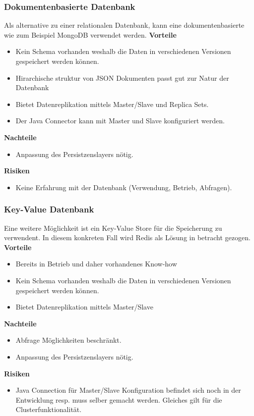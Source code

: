\subsubsection{Dokumentenbasierte Datenbank}

Als alternative zu einer relationalen Datenbank, kann eine dokumentenbasierte wie zum Beispiel MongoDB verwendet werden. 
\newline
\textbf{Vorteile}
\begin{itemize}
	\item Kein Schema vorhanden weshalb die Daten in verschiedenen Versionen gespeichert werden können.
	\item Hirarchische struktur von JSON Dokumenten passt gut zur Natur der Datenbank
	\item Bietet Datenreplikation mittels Master/Slave und Replica Sets.
	\item Der Java Connector kann mit Master und Slave konfiguriert werden.
\end{itemize}
\textbf{Nachteile}
\begin{itemize}
	\item Anpassung des Persistzenslayers nötig.
\end{itemize}
\textbf{Risiken}
\begin{itemize}
	\item Keine Erfahrung mit der Datenbank (Verwendung, Betrieb, Abfragen).
\end{itemize}

\subsubsection{Key-Value Datenbank}

Eine weitere Möglichkeit ist ein Key-Value Store für die Speicherung zu verwendent. In diesem konkreten Fall wird Redis als Lösung in betracht gezogen. 
\newline
\textbf{Vorteile}
\begin{itemize}
	\item Bereits in Betrieb und daher vorhandenes Know-how
	\item Kein Schema vorhanden weshalb die Daten in verschiedenen Versionen gespeichert werden können.
	\item Bietet Datenreplikation mittels Master/Slave
\end{itemize}
\textbf{Nachteile}
\begin{itemize}
	\item Abfrage Möglichkeiten beschränkt.
	\item Anpassung des Persistzenslayers nötig.
\end{itemize}
\textbf{Risiken}
\begin{itemize}
	\item Java Connection für Master/Slave Konfiguration befindet sich noch in der Entwicklung resp. muss selber gemacht werden. Gleiches gilt für die Clusterfunktionalität.
\end{itemize}


